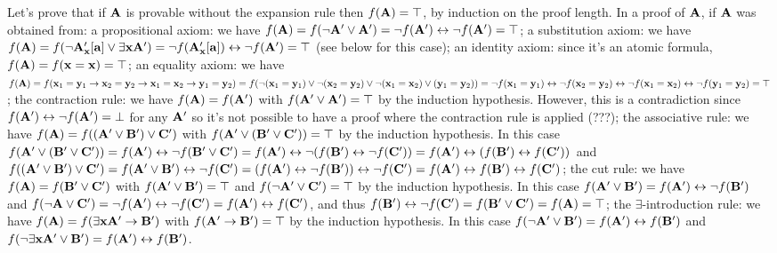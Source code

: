 Let's prove that if ${\bf A}$ is provable without the expansion rule then $f({\bf A}) = \top$, by induction on the proof length.
In a proof of ${\bf A}$, if ${\bf A}$ was obtained from:
\itemitem{$\bullet$} a propositional axiom: we have $f({\bf A}) = f(\neg {\bf A}' \lor {\bf A}') = \neg f({\bf A}') \leftrightarrow \neg f({\bf A}') = \top$;
\itemitem{$\bullet$} a substitution axiom: we have 
$f({\bf A}) = f(\neg {\bf A}'_{\bf x}[{\bf a}] \lor \exists {\bf x}{\bf A}') = \neg f({\bf A}'_{\bf x}[{\bf a}]) \leftrightarrow \neg f({\bf A}') = \top$ (see below for this case);
\itemitem{$\bullet$} an identity axiom: since it's an atomic formula, $f({\bf A}) = f({\bf x} = {\bf x}) = \top$;
\itemitem{$\bullet$} an equality axiom: we have $f({\bf A}) = 
f({\bf x}_1 = {\bf y}_1 \to {\bf x}_2 = {\bf y}_2 \to {\bf x}_1 = {\bf x}_2 \to {\bf y}_1 = {\bf y}_2) =
f(\neg ({\bf x}_1 = {\bf y}_1) \lor \neg ({\bf x}_2 = {\bf y}_2) \lor \neg ({\bf x}_1 = {\bf x}_2) \lor ({\bf y}_1 = {\bf y}_2)) =
\neg f({\bf x}_1 = {\bf y}_1) \leftrightarrow \neg f({\bf x}_2 = {\bf y}_2) \leftrightarrow \neg f({\bf x}_1 = {\bf x}_2) \leftrightarrow \neg f({\bf y}_1 = {\bf y}_2) = \top$;
\itemitem{$\bullet$} the contraction rule: we have $f({\bf A}) = f({\bf A}')$ with $f({\bf A}' \lor {\bf A}') = \top$ by the induction hypothesis. 
However, this is a contradiction since $f({\bf A}') \leftrightarrow \neg f({\bf A}') = \bot$ for any $\bf A'$ so it's not possible to have a proof where the contraction rule is applied (???);
\itemitem{$\bullet$} the associative rule: we have $f({\bf A}) = f(({\bf A}' \lor {\bf B}') \lor {\bf C}')$ with $f({\bf A}' \lor ({\bf B}' \lor {\bf C}')) = \top$ by the induction hypothesis.
In this case $f({\bf A}' \lor ({\bf B}' \lor {\bf C}')) = f({\bf A}') \leftrightarrow \neg f({\bf B}' \lor {\bf C}') = f({\bf A}') \leftrightarrow \neg (f({\bf B}') \leftrightarrow \neg f({\bf C}')) =
f({\bf A}') \leftrightarrow (f({\bf B}') \leftrightarrow f({\bf C}'))$ and $f(({\bf A}' \lor {\bf B}') \lor {\bf C}') = f({\bf A}' \lor {\bf B}') \leftrightarrow \neg f({\bf C}') =
(f({\bf A}') \leftrightarrow \neg f({\bf B}')) \leftrightarrow \neg f({\bf C}') = f({\bf A}') \leftrightarrow f({\bf B}') \leftrightarrow f({\bf C}')$;
\itemitem{$\bullet$} the cut rule: we have $f({\bf A}) = f({\bf B}' \lor {\bf C}')$ with $f({\bf A}' \lor {\bf B}') = \top$ and $f(\neg {\bf A}' \lor {\bf C}') = \top$ by the induction hypothesis.
In this case $f({\bf A}' \lor {\bf B}') = f({\bf A}') \leftrightarrow \neg f({\bf B}')$ and 
$f(\neg {\bf A} \lor {\bf C}') = \neg f({\bf A}') \leftrightarrow \neg f({\bf C}') = f({\bf A}') \leftrightarrow f({\bf C}')$, and 
thus $f({\bf B}') \leftrightarrow \neg f({\bf C}') = f({\bf B}' \lor {\bf C}') = f({\bf A}) = \top$;
\itemitem{$\bullet$} the $\exists$-introduction rule: we have $f({\bf A}) = f(\exists {\bf x}{\bf A}' \to {\bf B}')$ with $f({\bf A}' \to {\bf B}') = \top$ by the induction hypothesis.
In this case $f(\neg {\bf A}' \lor {\bf B}') = f({\bf A}') \leftrightarrow f({\bf B}')$ and $f(\neg \exists {\bf x}{\bf A}' \lor {\bf B}') = f({\bf A}') \leftrightarrow f({\bf B}')$.

